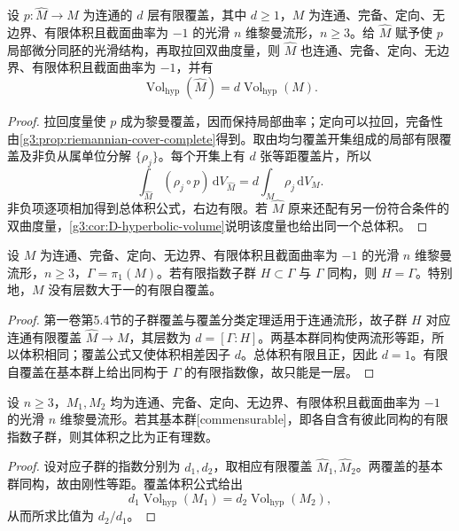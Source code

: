 \begin{proposition}\label{g3:prop:D-finite-cover-volume}
	设 \(p:\widehat M\to M\) 为连通的 \(d\) 层有限覆盖，其中 \(d\ge1\)，\(M\) 为连通、完备、定向、无边界、有限体积且截面曲率为 \(-1\) 的光滑 \(n\) 维黎曼流形，\(n\ge3\)。给 \(\widehat M\) 赋予使 \(p\) 局部微分同胚的光滑结构，再取拉回双曲度量，则 \(\widehat M\) 也连通、完备、定向、无边界、有限体积且截面曲率为 \(-1\)，并有
	\[
		\operatorname{Vol}_{\mathrm{hyp}}(\widehat M)
		=d\operatorname{Vol}_{\mathrm{hyp}}(M).
	\]
\end{proposition}
\begin{proof}
	拉回度量使 \(p\) 成为黎曼覆盖，因而保持局部曲率；定向可以拉回，完备性由\cref{g3:prop:riemannian-cover-complete}得到。取由均匀覆盖开集组成的局部有限覆盖及非负从属单位分解 \(\{\rho_j\}\)。每个开集上有 \(d\) 张等距覆盖片，所以
	\[
		\int_{\widehat M}(\rho_j\circ p)\,\mathrm dV_{\widehat M}
		=d\int_M\rho_j\,\mathrm dV_M.
	\]
	非负项逐项相加得到总体积公式，右边有限。若 \(\widehat M\) 原来还配有另一份符合条件的双曲度量，\cref{g3:cor:D-hyperbolic-volume}说明该度量也给出同一个总体积。
\end{proof}

\begin{corollary}\label{g3:cor:D-finite-index-rigidity}
	设 \(M\) 为连通、完备、定向、无边界、有限体积且截面曲率为 \(-1\) 的光滑 \(n\) 维黎曼流形，\(n\ge3\)，\(\Gamma=\pi_1(M)\)。若有限指数子群 \(H\subset\Gamma\) 与 \(\Gamma\) 同构，则 \(H=\Gamma\)。特别地，\(M\) 没有层数大于一的有限自覆盖。
\end{corollary}
\begin{proof}
	第一卷第5.4节的子群覆盖与覆盖分类定理适用于连通流形，故子群 \(H\) 对应连通有限覆盖 \(\widehat M\to M\)，其层数为 \(d=[\Gamma:H]\)。两基本群同构使两流形等距，所以体积相同；覆盖公式又使体积相差因子 \(d\)。总体积有限且正，因此 \(d=1\)。有限自覆盖在基本群上给出同构于 \(\Gamma\) 的有限指数像，故只能是一层。
\end{proof}

\begin{corollary}\label{g3:cor:D-commensurable-volume}
	设 \(n\ge3\)，\(M_1,M_2\) 均为连通、完备、定向、无边界、有限体积且截面曲率为 \(-1\) 的光滑 \(n\) 维黎曼流形。若其基本群[commensurable]，即各自含有彼此同构的有限指数子群，则其体积之比为正有理数。
\end{corollary}
\begin{proof}
	设对应子群的指数分别为 \(d_1,d_2\)，取相应有限覆盖 \(\widehat M_1,\widehat M_2\)。两覆盖的基本群同构，故由刚性等距。覆盖体积公式给出
	\[
		d_1\operatorname{Vol}_{\mathrm{hyp}}(M_1)
		=d_2\operatorname{Vol}_{\mathrm{hyp}}(M_2),
	\]
	从而所求比值为 \(d_2/d_1\)。
\end{proof}

